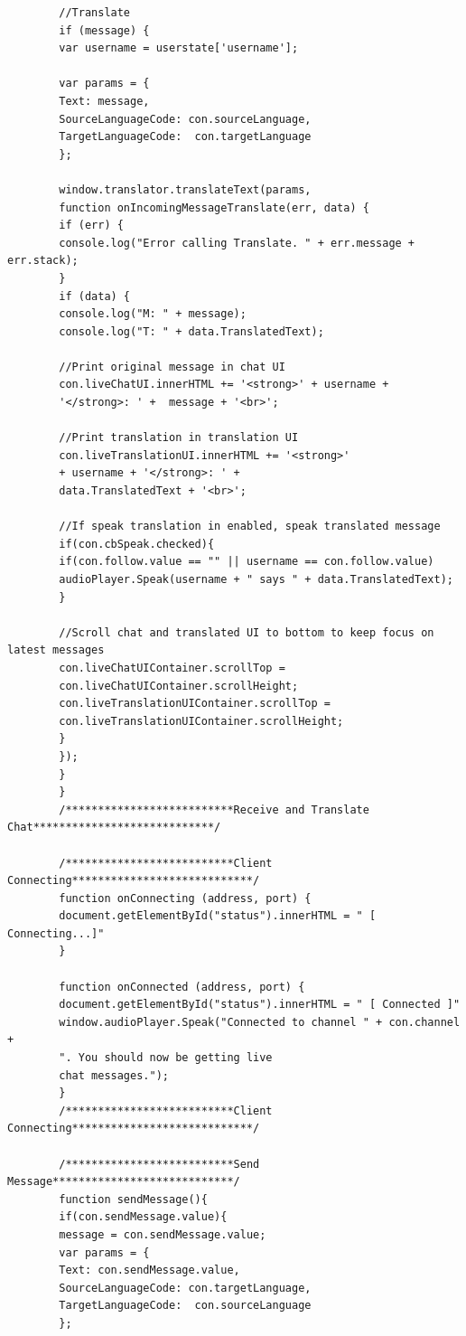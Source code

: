 \documentclass[english,runningheads,a4paper]{llncs}[2018/03/10]
\begin{document}
{\begin{verbatim}
        //Translate
        if (message) {
        var username = userstate['username'];
        
        var params = {
        Text: message,
        SourceLanguageCode: con.sourceLanguage,
        TargetLanguageCode:  con.targetLanguage
        };
        
        window.translator.translateText(params, 
        function onIncomingMessageTranslate(err, data) {
        if (err) {
        console.log("Error calling Translate. " + err.message + err.stack);
        }
        if (data) {
        console.log("M: " + message);
        console.log("T: " + data.TranslatedText);
        
        //Print original message in chat UI
        con.liveChatUI.innerHTML += '<strong>' + username + 
        '</strong>: ' +  message + '<br>';
        
        //Print translation in translation UI
        con.liveTranslationUI.innerHTML += '<strong>' 
        + username + '</strong>: ' +
        data.TranslatedText + '<br>';
        
        //If speak translation in enabled, speak translated message
        if(con.cbSpeak.checked){
        if(con.follow.value == "" || username == con.follow.value)
        audioPlayer.Speak(username + " says " + data.TranslatedText);
        }
        
        //Scroll chat and translated UI to bottom to keep focus on latest messages
        con.liveChatUIContainer.scrollTop = 
        con.liveChatUIContainer.scrollHeight;
        con.liveTranslationUIContainer.scrollTop = 
        con.liveTranslationUIContainer.scrollHeight;
        }
        });
        }
        }
        /**************************Receive and Translate Chat****************************/
        
        /**************************Client Connecting****************************/
        function onConnecting (address, port) {
        document.getElementById("status").innerHTML = " [ Connecting...]"
        }
        
        function onConnected (address, port) {
        document.getElementById("status").innerHTML = " [ Connected ]"
        window.audioPlayer.Speak("Connected to channel " + con.channel +
        ". You should now be getting live
        chat messages.");
        }
        /**************************Client Connecting****************************/
        
        /**************************Send Message****************************/
        function sendMessage(){
        if(con.sendMessage.value){
        message = con.sendMessage.value;
        var params = {
        Text: con.sendMessage.value,
        SourceLanguageCode: con.targetLanguage,
        TargetLanguageCode:  con.sourceLanguage
        };
        

\end{verbatim}}
\end{document}
